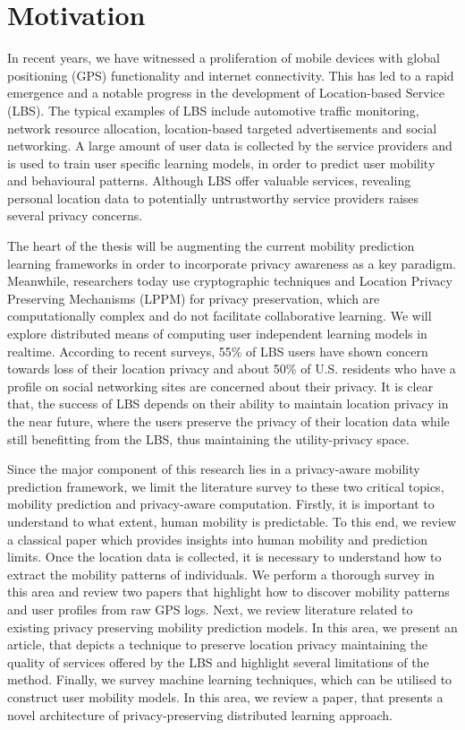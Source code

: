 \newpage
\section*{Motivation} \label{motivation}
In recent years, we have witnessed a proliferation of mobile devices with global positioning 
(GPS) functionality and internet connectivity. This has led to a rapid emergence and a notable 
progress in the development of Location-based Service (LBS). The typical examples of LBS
include automotive traffic monitoring, network resource allocation, location-based 
targeted advertisements and social networking. A large amount of user data is collected by the 
service providers and is used to train user specific learning models, in order to predict user 
mobility and behavioural patterns. Although LBS offer valuable services, revealing personal location 
data to potentially untrustworthy service providers raises several privacy concerns.\newline

The heart of the thesis will be augmenting the current mobility prediction learning frameworks in order
to incorporate privacy awareness as a key paradigm. Meanwhile, researchers today use cryptographic
techniques and Location Privacy Preserving Mechanisms (LPPM) for privacy preservation, which are 
computationally complex and do not facilitate collaborative learning. We will explore 
distributed means of computing user independent learning models in realtime. According to recent 
surveys, 55\% of LBS users have shown concern towards loss of their location privacy and about 50\% of 
U.S. residents who have a profile on social networking sites are concerned about their privacy. 
It is clear that, the success of LBS depends on their ability to maintain location privacy in the near
future, where the users preserve the privacy of their location data while still benefitting from the LBS, thus 
maintaining the utility-privacy space.\newline

Since the major component of this research lies in a privacy-aware mobility prediction framework, we
limit the literature survey to these two critical topics, mobility prediction and privacy-aware
computation. Firstly, it is important to understand to what extent, human mobility is predictable. 
To this end, we review a classical paper which provides insights into human mobility and
prediction limits. Once the location data is collected, it is necessary to understand how to extract 
the mobility patterns of individuals. We perform a thorough survey in this area and review two
papers that highlight how to discover mobility patterns and user profiles from raw GPS logs. Next, 
we review literature related to existing privacy preserving mobility prediction models. In this
area, we present an article, that depicts a technique to preserve location privacy maintaining the 
quality of services offered by the LBS and highlight several limitations of the method. 
Finally, we survey machine learning techniques, which can be utilised to construct user mobility 
models. In this area, we review a paper, that presents a novel architecture of privacy-preserving 
distributed learning approach.  



